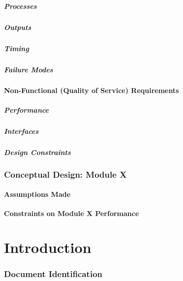 \documentclass[]{report}
\begin{document}
\subsubsection{Processes}
\subsubsection{Outputs}
\subsubsection{Timing}
\subsubsection{Failure Modes}

\subsection{Non-Functional (Quality of Service) Requirements}
\subsubsection{Performance}
\subsubsection{Interfaces}
\subsubsection{Design Constraints}


\section{Conceptual Design: Module X}
\subsection{Assumptions Made}
\subsection{Constraints on Module X Performance}

\part{Introduction}
\section{Document Identification}
\end{document}
